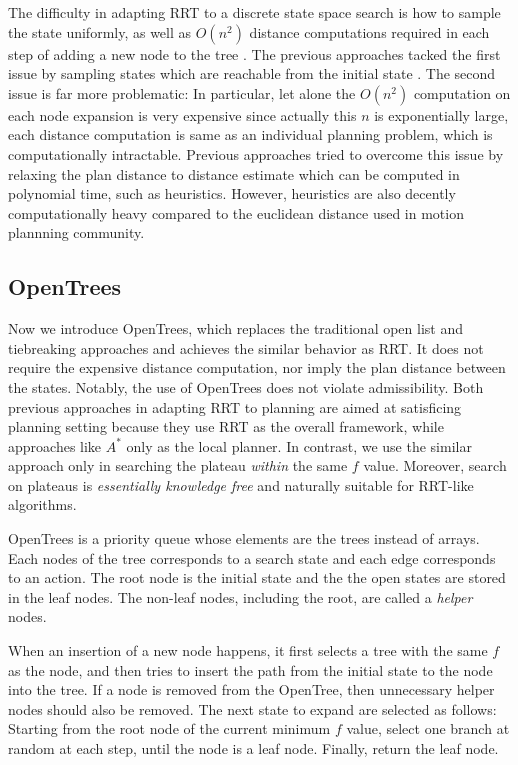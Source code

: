 The difficulty in adapting RRT to a discrete state space search is how to sample the state uniformly, as well as $O(n^2)$ distance computations required in each step of adding a new node to the tree \cite{alcazar2011adapting}. The previous approaches tacked the first issue by sampling states which are reachable from the initial state \cite{alcazar2011adapting}. The second issue is far more problematic: In particular, let alone the $O(n^2)$ computation on each node expansion is very expensive since actually this $n$ is exponentially large, each distance computation is same as an individual planning problem, which is computationally intractable. Previous approaches tried to overcome this issue by relaxing the plan distance to distance estimate which can be computed in polynomial time, such as \ff heuristics. 
However, \ff heuristics are also decently computationally heavy compared to the euclidean distance used in motion plannning community.

\subsection{OpenTrees}

Now we introduce OpenTrees, which replaces the traditional open list and tiebreaking approaches and achieves the similar behavior as RRT.
It does not require the expensive distance computation, nor imply the plan distance between the states.
Notably, the use of OpenTrees does not violate admissibility. Both previous approaches in adapting RRT to planning are aimed at satisficing planning setting because they use RRT as the overall framework, while \sota approaches like $A^*$ only as the local planner. In contrast, we use the similar approach only in searching the plateau \emph{within} the same $f$ value. Moreover, search on plateaus is \emph{essentially knowledge free} and naturally suitable for RRT-like algorithms.

OpenTrees is a priority queue whose elements are the trees instead of arrays. Each nodes of the tree corresponds to a search state and each edge corresponds to an action.
The root node is the initial state and the the open states are stored in the leaf nodes.
The non-leaf nodes, including the root, are called a \emph{helper} nodes.

When an insertion of a new node happens, it first selects a tree with the same $f$ as the node, and then tries to insert the path from the initial state to the node into the tree. If a node is removed from the OpenTree, then unnecessary helper nodes should also be removed. The next state to expand are selected as follows: Starting from the root node of the current minimum $f$ value, select one branch at random at each step, until the node is a leaf node. Finally, return the leaf node.

